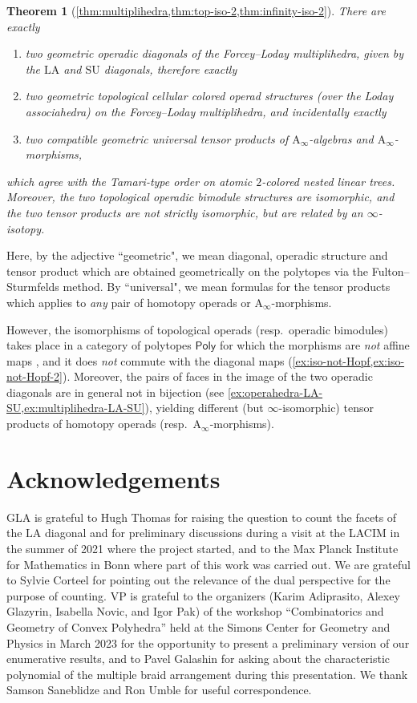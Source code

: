 \documentclass{amsart}
\newtheorem*{theorem*}{Theorem}
\theoremstyle{definition}
\newcommand{\resp}{resp.~} %
\newcommand{\SU}{\mathrm{SU}}
\newcommand{\LA}{\mathrm{LA}}
\newcommand{\PolySub}{\mathsf{Poly}}
\newcommand{\Ainf}{\ensuremath{\mathrm{A}_\infty}}
\begin{document}
\begin{theorem*}[{\cref{thm:multiplihedra,thm:top-iso-2,thm:infinity-iso-2}}]
	There are exactly 
	\begin{enumerate}
	\item two geometric operadic diagonals of the Forcey--Loday multiplihedra, given by the $\LA$ and $\SU$ diagonals, therefore exactly
	\item two geometric topological cellular colored operad structures (over the Loday associahedra) on the Forcey--Loday multiplihedra, and incidentally exactly
	\item two compatible geometric universal tensor products of $\Ainf$-algebras and $\Ainf$-morphisms,
	\end{enumerate}
	which agree with the Tamari-type order on atomic $2$-colored nested linear trees. 
	Moreover, the two topological operadic bimodule structures are isomorphic, and the two tensor products are not strictly isomorphic, but are related by an $\infty$-isotopy. 
\end{theorem*}

Here, by the adjective ``geometric", we mean diagonal, operadic structure and tensor product which are obtained geometrically on the polytopes via the Fulton--Sturmfelds method. 
By ``universal", we mean formulas for the tensor products which applies to \emph{any} pair of homotopy operads or $\Ainf$-morphisms.

However, the isomorphisms of topological operads (\resp operadic bimodules) takes place in a category of polytopes $\PolySub$ for which the morphisms are \emph{not} affine maps \cite[Def. 4.13]{LaplanteAnfossi}, and it does \emph{not} commute with the diagonal maps (\cref{ex:iso-not-Hopf,ex:iso-not-Hopf-2}).
Moreover, the pairs of faces in the image of the two operadic diagonals are in general not in bijection (see \cref{ex:operahedra-LA-SU,ex:multiplihedra-LA-SU}), yielding different (but $\infty$-isomorphic) tensor products of homotopy operads (\resp $\Ainf$-morphisms).  


\section*{Acknowledgements}

GLA is grateful to Hugh Thomas for raising the question to count the facets of the $\LA$ diagonal and for preliminary discussions during a visit at the LACIM in the summer of 2021 where the project started, and to the Max Planck Institute for Mathematics in Bonn where part of this work was carried out.
We are grateful to Sylvie Corteel for pointing out the relevance of the dual perspective for the purpose of counting.
VP is grateful to the organizers (Karim Adiprasito, Alexey Glazyrin, Isabella Novic, and Igor Pak) of the workshop ``Combinatorics and Geometry of Convex Polyhedra'' held at the Simons Center for Geometry and Physics in March 2023 for the opportunity to present a preliminary version of our enumerative results, and to  Pavel Galashin for asking about the characteristic polynomial of the multiple braid arrangement during this presentation.
We thank Samson Saneblidze and Ron Umble for useful correspondence.
\end{document}
